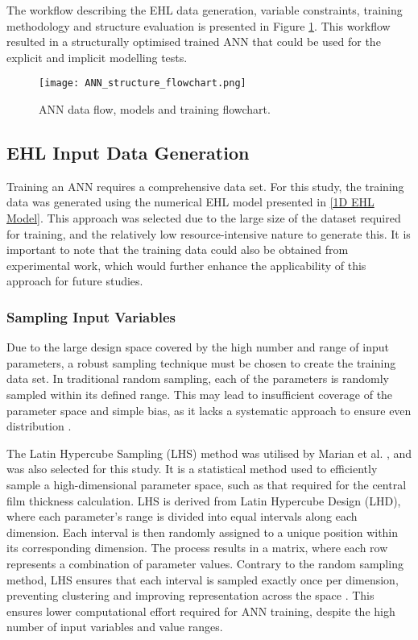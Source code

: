 The workflow describing the EHL data generation, variable constraints, training methodology and structure evaluation is presented in Figure \ref{ANN flowchart}. This workflow resulted in a structurally optimised trained ANN that could be used for the explicit and implicit modelling tests.

\begin{figure}  
	\centering
	\texttt{[image: ANN\_structure\_flowchart.png]}
	\caption{ANN data flow, models and training flowchart.}
	\label{ANN flowchart}
\end{figure} 

\subsection{EHL Input Data Generation}

Training an ANN requires a comprehensive data set. For this study, the training data was generated using the numerical EHL model presented in \ref{1D EHL Model}. This approach was selected due to the large size of the dataset required for training, and the relatively low resource-intensive nature to generate this. It is important to note that the training data could also be obtained from experimental work, which would further enhance the applicability of this approach for future studies.

\subsubsection{Sampling Input Variables}

Due to the large design space covered by the high number and range of input parameters, a robust sampling technique must be chosen to create the training data set. In traditional random sampling, each of the parameters is randomly sampled within its defined range. This may lead to insufficient coverage of the parameter space and simple bias, as it lacks a systematic approach to ensure even distribution \cite{Preece2016}.

The Latin Hypercube Sampling (LHS) method was utilised by Marian et al. \cite{Marian2022}, and was also selected for this study. It is a statistical method used to efficiently sample a high-dimensional parameter space, such as that required for the central film thickness calculation. LHS is derived from Latin Hypercube Design (LHD), where each parameter’s range is divided into equal intervals along each dimension. Each interval is then randomly assigned to a unique position within its corresponding dimension. The process results in a matrix, where each row represents a combination of parameter values. Contrary to the random sampling method, LHS ensures that each interval is sampled exactly once per dimension, preventing clustering and improving representation across the space \cite{Preece2016}. This ensures lower computational effort required for ANN training, despite the high number of input variables and value ranges.


